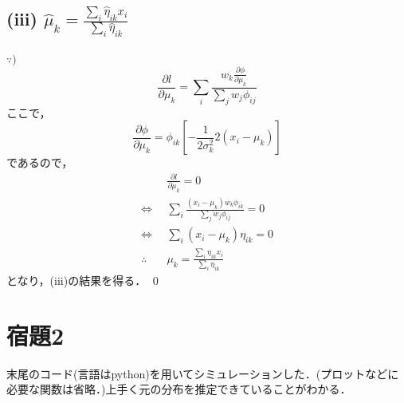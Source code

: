 \documentclass[11pt,a4paper,dvipdfmx]{article}
\theoremstyle{plain}
\renewcommand{\hat}{\widehat}
\newcommand{\equi}{\Longleftrightarrow}
\newcommand{\1}{\mbox{1}\hspace{-0.25em}\mbox{l}}
\begin{document}
\subsection*{(iii) $\hat{\mu}_k = \frac{\sum_i \hat{\eta}_{ik} x_i}{\sum_i \hat{\eta}_{ik}}$}
$\because)$
\begin{equation*}
	\frac{\partial l}{\partial \mu_k} = \sum_i
	\frac{w_k \frac{\partial \phi}{\partial \mu_k}}{\sum_j w_j \phi_{ij}}
\end{equation*}
ここで，
\begin{equation*}
	\frac{\partial \phi}{\partial \mu_k} = \phi_{ik} \left[
	- \frac{1}{2 \sigma_k^2} 2 (x_i - \mu_k)
	\right]
\end{equation*}
であるので，
\begin{align*}
	&\frac{\partial l}{\partial \mu_k} = 0 \\
	\equi & \sum_i \frac{(x_i - \mu_k) w_k \phi_{ik}}{\sum_j w_j \phi_{ij}} = 0 \\
	\equi & \sum_i (x_i - \mu_k) \eta_{ik} = 0 \\
	\therefore \quad & \mu_k = \frac{\sum_i \eta_{ik} x_i}{\sum_i \eta_{ik}} 
\end{align*}
となり，(iii)の結果を得る．
\qed


\section*{宿題2}
末尾のコード(言語はpython)を用いてシミュレーションした．(プロットなどに必要な関数は省略．)上手く元の分布を推定できていることがわかる．
\end{document}
